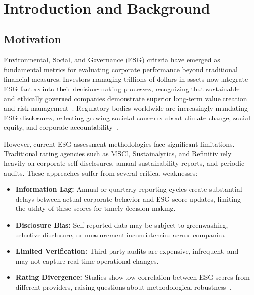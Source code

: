 \begin{center}
{\huge\textbf{\ttitle}}\\
\end{center}

\section{Introduction and Background}

\subsection{Motivation}

Environmental, Social, and Governance (ESG) criteria have emerged as fundamental metrics for evaluating corporate performance beyond traditional financial measures. Investors managing trillions of dollars in assets now integrate ESG factors into their decision-making processes, recognizing that sustainable and ethically governed companies demonstrate superior long-term value creation and risk management~\cite{friede2015esg}. Regulatory bodies worldwide are increasingly mandating ESG disclosures, reflecting growing societal concerns about climate change, social equity, and corporate accountability~\cite{eccles2014financial}.

However, current ESG assessment methodologies face significant limitations. Traditional rating agencies such as MSCI, Sustainalytics, and Refinitiv rely heavily on corporate self-disclosures, annual sustainability reports, and periodic audits. These approaches suffer from several critical weaknesses:

\begin{itemize}
\item \textbf{Information Lag:} Annual or quarterly reporting cycles create substantial delays between actual corporate behavior and ESG score updates, limiting the utility of these scores for timely decision-making.
\item \textbf{Disclosure Bias:} Self-reported data may be subject to greenwashing, selective disclosure, or measurement inconsistencies across companies.
\item \textbf{Limited Verification:} Third-party audits are expensive, infrequent, and may not capture real-time operational changes.
\item \textbf{Rating Divergence:} Studies show low correlation between ESG scores from different providers, raising questions about methodological robustness~\cite{berg2019aggregate}.
\end{itemize}

